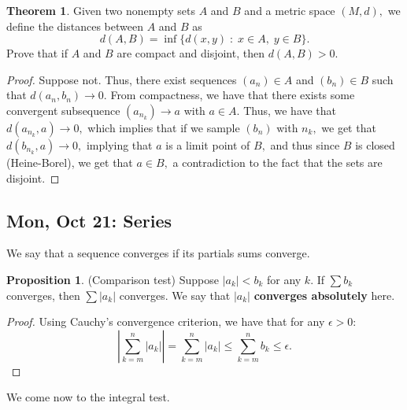 \documentclass[10pt, oneside]{article}
\theoremstyle{definition}
\newtheorem{thm}{Theorem}
\newtheorem{prop}{Proposition}
\begin{document}
\begin{thm}
    Given two nonempty sets $A$ and $B$ and a metric space $(M, d),$ we define the distances between $A$ and $B$ as
    \[d(A,B) = \inf\{d(x,y)\; : \; x\in A, \; y \in B\}.\] Prove that if $A$ and $B$ are compact and disjoint, then $d(A, B)>0.$
\end{thm}
\begin{proof}
    Suppose not. Thus, there exist sequences $(a_n)\in A$ and $(b_n)\in B$ such that $d(a_n, b_n)\to 0.$ From compactness, we have that there exists some convergent subsequence $(a_{n_k})\to a$ with $a\in A.$ Thus, we have that $d(a_{n_k}, a)\to 0,$ which implies that if we sample $(b_n)$ with $n_k,$ we get that $d(b_{n_k}, a)\to 0,$ implying that $a$ is a limit point of $B,$ and thus since $B$ is closed (Heine-Borel), we get that $a \in B,$ a contradiction to the fact that the sets are disjoint.
\end{proof}

\subsection{Mon, Oct 21: Series}
We say that a sequence converges if its partials sums converge. 
\begin{prop}
    (Comparison test) Suppose $|a_k|< b_k$ for any $k.$ If $\sum b_k$ converges, then $\sum |a_k|$ converges. We say that $|a_k|$ \textbf{converges absolutely} here. 
\end{prop}
\begin{proof}
    Using Cauchy's convergence criterion, we have that for any $\epsilon>0:$
    \[\left| \sum_{k=m}^n |a_k|\right|  = \sum_{k=m}^n |a_k| \leq \sum_{k=m}^n b_k \leq \epsilon.\]
\end{proof}
We come now to the integral test.
\end{document}
